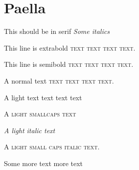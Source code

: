 \documentclass{scb}
\begin{document}
\section{Paella}

\rmfamily

This should be in serif
\textit{Some italics}

\sffamily

{\ebseries
This line is extrabold \textsc{text text text text}.}

{\sbseries
This line is semibold \textsc{text text text text}.}

A normal text \textsc{text text text text}.



\ltseries
A light text text text text

\textsc{A light smallcaps text}

\itshape A light italic text

\scshape A light small caps italic text.

\cleardoublepage

Some more text
\clearpage
more text
\end{document}
